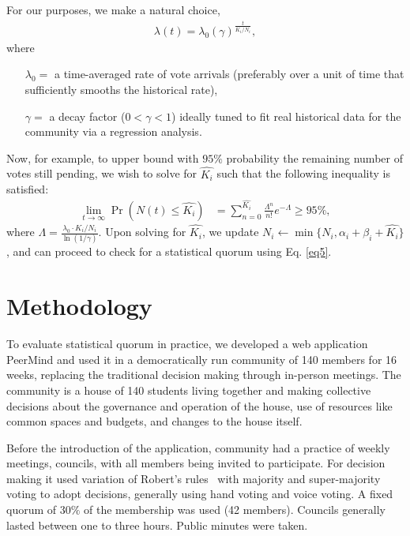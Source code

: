 \documentclass[format=acmsmall, review=true, screen=true, anonymous=true]{acmart}
\begin{document}
For our purposes, we make a natural choice,
\begin{align}\label{eq6}
\lambda (t) = \lambda_0 {(\gamma)}^{\frac{t}{K_i/N_i}},
\end{align}
where
\begin{itemize}
\item[$\lambda_0 =$] a time-averaged rate of vote arrivals (preferably over a unit of time that sufficiently smooths the historical rate),
\item[$\gamma =$] a decay factor ($0 < \gamma < 1$) ideally tuned to fit real historical data for the community via a regression analysis.
\end{itemize}
Now, for example, to upper bound with $95\%$ probability the remaining number of votes still pending, we wish to solve for $\hat{K_i}$ such that the following inequality is satisfied:
\begin{align}\label{eq7}
\lim_{t\rightarrow \infty}\Pr\left(N(t)\leq \hat{K_i}\right) & = \sum_{n=0}^{\hat{K_i}} \frac{\Lambda^n}{n!}e^{-\Lambda} \geq 95\%,
\end{align}
where $\Lambda = \frac{\lambda_0 \cdot K_i/N_i}{\ln{(1/\gamma)}}$.
Upon solving for $\hat{K_i}$, we update $N_i \leftarrow \min\{N_i,\alpha_i + \beta_i + \hat{K_i}\}$, and can proceed to check for a statistical quorum using Eq. \ref{eq5}.


\section{Methodology}
\label{sec:methodology}

To evaluate statistical quorum in practice, we developed a web application PeerMind and
used it in a democratically run community of 140 members for 16 weeks, replacing the traditional
decision making through in-person meetings. The community is a house of 140
students living together and making collective decisions about the governance and operation of
the house, use of resources like common spaces and budgets, and changes to the house itself.

Before the introduction of the application, community had a practice of weekly meetings, councils, with all
members being invited to participate. For decision making it used variation of Robert's rules~\cite{roberts}
with majority and super-majority voting to adopt decisions, generally using hand voting and voice voting.
A fixed quorum of $30\%$ of the membership was used (42 members). Councils generally lasted between one to three hours.
Public minutes were taken.
\end{document}
